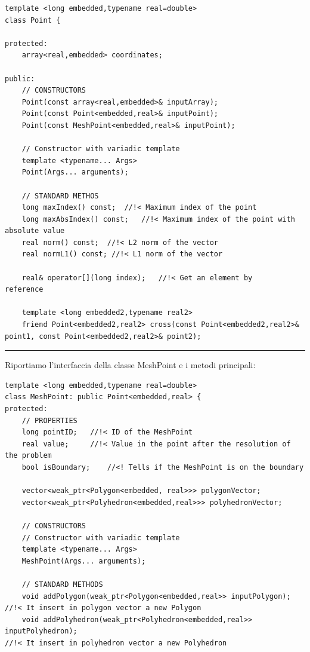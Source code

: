 \documentclass[oneside,12pt]{book}  %
\theoremstyle{plain}
\theoremstyle{definition}
\theoremstyle{remark}
\numberwithin{equation}{chapter} %
\begin{document}
\begin{verbatim}
template <long embedded,typename real=double>
class Point {

protected:
    array<real,embedded> coordinates;

public:
    // CONSTRUCTORS
    Point(const array<real,embedded>& inputArray);
    Point(const Point<embedded,real>& inputPoint);
    Point(const MeshPoint<embedded,real>& inputPoint);

    // Constructor with variadic template
    template <typename... Args>
    Point(Args... arguments);

    // STANDARD METHOS
    long maxIndex() const;	//!< Maximum index of the point
    long maxAbsIndex() const;	//!< Maximum index of the point with absolute value
    real norm() const;  //!< L2 norm of the vector
    real normL1() const; //!< L1 norm of the vector

    real& operator[](long index);	//!< Get an element by
reference

    template <long embedded2,typename real2>
    friend Point<embedded2,real2> cross(const Point<embedded2,real2>&
point1, const Point<embedded2,real2>& point2);
\end{verbatim}

\noindent\rule{14cm}{1pt}

Riportiamo l'interfaccia della classe MeshPoint e i metodi principali:

\begin{verbatim}
template <long embedded,typename real=double>
class MeshPoint: public Point<embedded,real> {
protected:
    // PROPERTIES
    long pointID;	//!< ID of the MeshPoint
    real value;		//!< Value in the point after the resolution of the problem
    bool isBoundary;	//<! Tells if the MeshPoint is on the boundary

    vector<weak_ptr<Polygon<embedded, real>>> polygonVector;
    vector<weak_ptr<Polyhedron<embedded,real>>> polyhedronVector;

    // CONSTRUCTORS
    // Constructor with variadic template
    template <typename... Args>
    MeshPoint(Args... arguments);

    // STANDARD METHODS
    void addPolygon(weak_ptr<Polygon<embedded,real>> inputPolygon); 
//!< It insert in polygon vector a new Polygon
    void addPolyhedron(weak_ptr<Polyhedron<embedded,real>> inputPolyhedron);	
//!< It insert in polyhedron vector a new Polyhedron


\end{verbatim}
\end{document}
